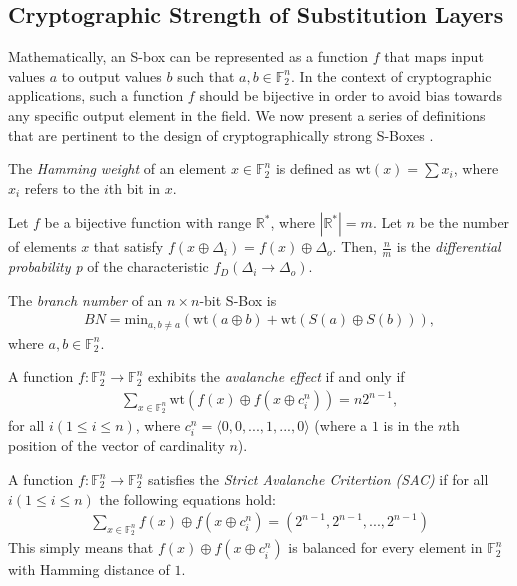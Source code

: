 \documentclass[11pt]{article}
\newcommand{\field}[1]{\mathbb{#1}} %
\begin{document}
\subsection{Cryptographic Strength of Substitution Layers}
Mathematically, an S-box can be represented as a function $f$ that maps input values $a$ to output values $b$ such that $a,b \in \field{F}_2^n$. In the context of cryptographic applications, such a function $f$ should be bijective in order to avoid bias towards any specific output element in the field. We now present a series of definitions that are pertinent to the design of cryptographically strong S-Boxes \cite{Mar_newanalysis}.


\begin{define}
The \emph{Hamming weight} of an element $x \in \field{F}_2^n$ is defined as wt$(x) = \sum x_i$, where $x_i$ refers to the $i$th bit in $x$.
\end{define}

\begin{define}
Let $f$ be a bijective function with range $\mathbb{R^*}$, where $|\mathbb{R^*}| = m$. Let $n$ be the number of elements $x$ that satisfy $f(x \oplus \Delta_i) = f(x) \oplus \Delta_o$. Then, $\frac{n}{m}$ is the \emph{differential probability p} of the characteristic $f_D(\Delta_i \to \Delta_o)$.
\end{define}

\begin{define}
The \emph{branch number} of an $n \times n$-bit S-Box is
\begin{eqnarray}
BN = \text{min}_{a, b\not=a}(\text{wt}(a \oplus b) + \text{wt}(S(a) \oplus S(b))),
\end{eqnarray}
where $a, b \in \field{F}_2^n$.
\end{define}

\begin{define}
A function $f : \field{F}_2^n \to \field{F}_2^n$ exhibits the \emph{avalanche effect} if and only if 
\begin{eqnarray}
\sum_{x \in \field{F}_2^n} \text{wt}(f(x) \oplus f(x \oplus c_{i}^{n})) = n2^{n-1},
\end{eqnarray}
for all $i (1 \leq i \leq n)$, where $c_{i}^{n} = \langle 0, 0, ..., 1, ..., 0 \rangle$ (where a $1$ is in the $n$th position of the vector of cardinality $n$).
\end{define}

\begin{define}
A function $f : \field{F}_2^n \to \field{F}_2^n$ satisfies the \emph{Strict Avalanche Critertion (SAC)} if for all $i (1 \leq i \leq n)$ the following equations hold:
\begin{eqnarray*}
\sum_{x \in \field{F}_2^n} f(x) \oplus f(x \oplus c_i^n) = (2^{n-1}, 2^{n-1}, ..., 2^{n-1})
\end{eqnarray*}
This simply means that $f(x) \oplus f(x \oplus c_i^n)$ is balanced for every element in $\field{F}_2^n$ with Hamming distance of $1$. 
\end{define}
\end{document}

